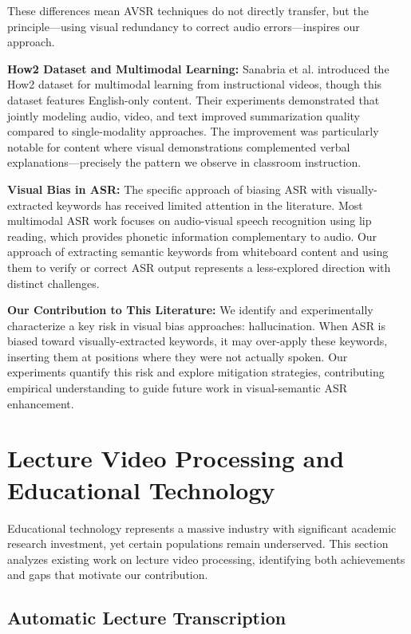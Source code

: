 These differences mean AVSR techniques do not directly transfer, but the principle---using visual redundancy to correct audio errors---inspires our approach.

\textbf{How2 Dataset and Multimodal Learning:} Sanabria et al. \cite{Sanabria2018} introduced the How2 dataset for multimodal learning from instructional videos, though this dataset features English-only content. Their experiments demonstrated that jointly modeling audio, video, and text improved summarization quality compared to single-modality approaches. The improvement was particularly notable for content where visual demonstrations complemented verbal explanations---precisely the pattern we observe in classroom instruction.

\textbf{Visual Bias in ASR:} The specific approach of biasing ASR with visually-extracted keywords has received limited attention in the literature. Most multimodal ASR work focuses on audio-visual speech recognition using lip reading, which provides phonetic information complementary to audio. Our approach of extracting semantic keywords from whiteboard content and using them to verify or correct ASR output represents a less-explored direction with distinct challenges.

\textbf{Our Contribution to This Literature:} We identify and experimentally characterize a key risk in visual bias approaches: hallucination. When ASR is biased toward visually-extracted keywords, it may over-apply these keywords, inserting them at positions where they were not actually spoken. Our experiments quantify this risk and explore mitigation strategies, contributing empirical understanding to guide future work in visual-semantic ASR enhancement.

\section{Lecture Video Processing and Educational Technology}

Educational technology represents a massive industry with significant academic research investment, yet certain populations remain underserved. This section analyzes existing work on lecture video processing, identifying both achievements and gaps that motivate our contribution.

\subsection{Automatic Lecture Transcription}


